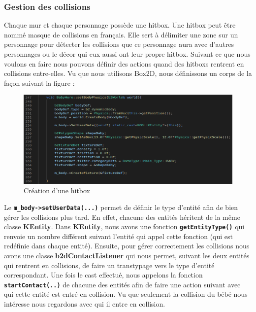 \documentclass{article}
\begin{document}
\subsubsection{Gestion des collisions}
Chaque mur et chaque personnage possède une hitbox. Une hitbox peut être nommé \og masque de collisions \fg en français. Elle sert à délimiter une zone sur un personnage pour détecter les collisions que ce personnage aura avec d'autres personnages ou le décor qui eux aussi ont leur propre hitbox. Suivant ce que nous voulons en faire nous pouvons définir des actions quand des hitboxs rentrent en collisions entre-elles. Vu que nous utilisons Box2D, nous définissons un corps de la façon suivant la figure :
\begin{figure}[ht]
    \begin{center}
    \includegraphics[scale=0.55]{images/creation_hitbox.PNG}
    \caption{Création d'une hitbox}
    \label{hitbox}
    \end{center}
\end{figure}
Le \texttt{\textbf{m\_body->setUserData(...)}} permet de définir le type d'entité afin de bien gérer les collisions plus tard. En effet, chacune des entités héritent de la même classe \textbf{KEntity}. Dans \textbf{KEntity}, nous avons une fonction \texttt{\textbf{getEntityType()}} qui renvoie un nombre différent suivant l'entité qui appel cette fonction (qui est redéfinie dans chaque entité). Ensuite, pour gérer correctement les collisions nous avons une classe \textbf{b2dContactListener} qui nous permet, suivant les deux entités qui rentrent en collisions, de faire un transtypage vers le type d'entité correspondant.
Une fois le cast effectué, nous appelons la fonction \texttt{\textbf{startContact(..)}} de chacune des entités afin de faire une action suivant avec qui cette entité est entré en collision. Vu que seulement la collision du bébé nous intéresse nous regardons avec qui il entre en collision.
\end{document}
